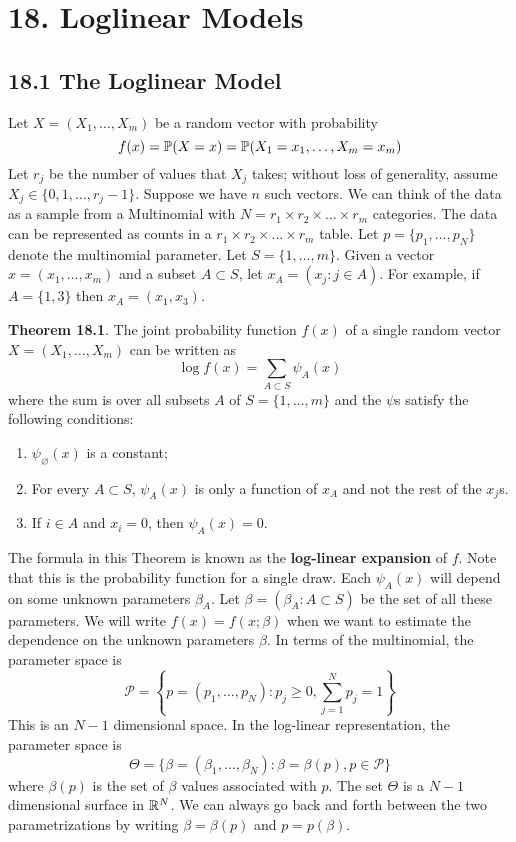 \section*{18. Loglinear Models}\label{loglinear-models}

\subsection*{18.1 The Loglinear Model}\label{the-loglinear-model}
Let \(X = (X_{1}, \dots, X_m)\) be a random vector with probability
\[
f(x) = \operatorname{\mathbb{P}}(X = x) = \operatorname{\mathbb{P}}(X_{1} = x_{1}, \dots, X_m = x_m)
\]
Let \(r_{j}\) be the number of values that \(X_{j}\) takes; without loss of
generality, assume \(X_{j} \in \{ 0, 1, \dots, r_{j} - 1 \}\). Suppose we
have \(n\) such vectors.
We can think of the data as a sample from a Multinomial with
\(N = r_{1} \times r_{2} \times \dots \times r_m\) categories. The data can
be represented as counts in a \(r_{1} \times r_{2} \times \dots \times r_m\)
table. Let \(p = \{ p_{1}, \dots, p_N \}\) denote the multinomial
parameter.
Let \(S = \{ 1, \dots, m \}\). Given a vector \(x = (x_{1}, \dots, x_m)\)
and a subset \(A \subset S\), let \(x_A = (x_{j} : j \in A)\). For
example, if \(A = \{1, 3\}\) then \(x_A = (x_{1}, x_{3})\).

\textbf{Theorem 18.1}. The joint probability function \(f(x)\) of a
single random vector \(X = (X_{1}, \dots, X_m)\) can be written as
\[
\log f(x) = \sum_{A \subset S} \psi_A(x)
\]
where the sum is over all subsets \(A\) of \(S = \{1, \dots, m \}\) and
the \(\psi\)s satisfy the following conditions:
\begin{enumerate}[tightlist,label={\arabic*.}]
\item
  \(\psi_\varnothing(x)\) is a constant;
\item
  For every \(A \subset S\), \(\psi_A(x)\) is only a function of \(x_A\)
  and not the rest of the \(x_{j}\)s.
\item
  If \(i \in A\) and \(x_{i} = 0\), then \(\psi_A(x) = 0\).
\end{enumerate}
The formula in this Theorem is known as the \textbf{log-linear
expansion} of \(f\). Note that this is the probability function for a
single draw. Each \(\psi_A(x)\) will depend on some unknown parameters
\(\beta_A\). Let \(\beta = (\beta_A : A \subset S)\) be the set of all
these parameters. We will write \(f(x) = f(x; \beta)\) when we want to
estimate the dependence on the unknown parameters \(\beta\).
In terms of the multinomial, the parameter space is
\[
\mathcal{P} = \left\{ p = (p_{1}, \dots, p_N) : p_{j} \geq 0, \sum_{j=1}^N p_{j} = 1 \right\}
\]
This is an \(N - 1\) dimensional space. In the log-linear
representation, the parameter space is
\[
\Theta = \Bigg\{ \beta = (\beta_{1}, \dots, \beta_N) : \beta = \beta(p), p \in \mathcal{P} \Bigg\}
\]
where \(\beta(p)\) is the set of \(\beta\) values associated with \(p\).
The set \(\Theta\) is a \(N - 1\) dimensional surface in
\(\mathbb{R}^N\). We can always go back and forth between the two
parametrizations by writing \(\beta = \beta(p)\) and \(p = p(\beta)\).

